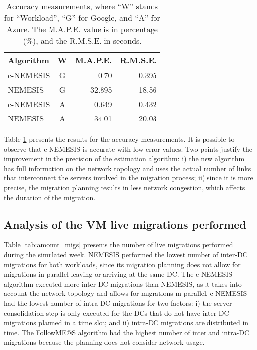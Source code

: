 \begin{table}[!htpb]
  \caption{Accuracy measurements, where ``W'' stands for ``Workload'', ``G'' for Google, and ``A'' for Azure. The M.A.P.E. value is in percentage (\%), and the R.M.S.E. in seconds. }\label{tab:accuracy} \centering
\begin{tabular}{|l|c|r|r|}
  \hline
  \textbf{Algorithm} & \textbf{W}  & \textbf{M.A.P.E.} & \textbf{R.M.S.E.}\\
  \hline
  c-NEMESIS  & G & 0.70  & 0.395 \\
  \hline
  NEMESIS & G & 32.895 & 18.56 \\
  \hline
  c-NEMESIS  & A & 0.649  & 0.432 \\
  \hline
  NEMESIS & A & 34.01 & 20.03 \\
  \hline
\end{tabular}
\end{table}



Table \ref{tab:accuracy} presents the results for the accuracy measurements. It is possible to observe that c-NEMESIS is accurate with low error values. Two points justify the improvement in the precision of the estimation algorithm: i) the new algorithm has full information on the network topology and uses the actual number of links that interconnect the servers involved in the migration process; ii) since it is more precise, the migration planning results in less network congestion, which affects the duration of the migration.


\subsection{Analysis of the VM live migrations performed}


Table \ref{tab:amount_migs} presents the number of live migrations performed during the simulated week. NEMESIS performed the lowest number of inter-DC migrations for both workloads, since its migration planning does not allow for migrations in parallel leaving or arriving at the same DC. The c-NEMESIS algorithm executed more inter-DC migrations than NEMESIS, as it takes into account the network topology and allows for migrations in parallel. c-NEMESIS had the lowest number of intra-DC migrations for two factors: i) the server consolidation step is only executed for the DCs that do not have inter-DC migrations planned in a time slot; and ii) intra-DC migrations are distributed in time. The FollowME@S algorithm had the highest number of inter and intra-DC migrations because the planning does not consider network usage.

